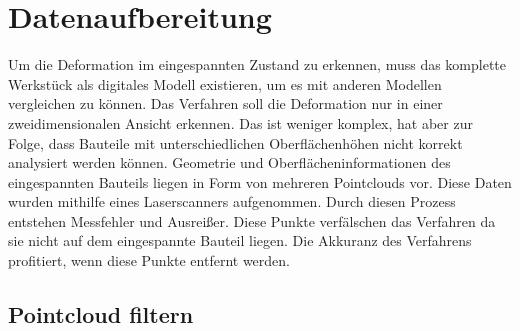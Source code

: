 

\chapter{Datenaufbereitung}

Um die Deformation im eingespannten Zustand zu erkennen, muss das komplette Werkstück
als digitales Modell existieren, um es mit anderen Modellen vergleichen zu können.
Das Verfahren soll die Deformation nur in einer zweidimensionalen Ansicht erkennen. 
Das ist weniger komplex, hat aber zur Folge, dass Bauteile mit unterschiedlichen 
Oberflächenhöhen nicht korrekt analysiert werden können. 
Geometrie und Oberflächeninformationen des eingespannten Bauteils liegen 
in Form von mehreren Pointclouds vor.
Diese Daten wurden mithilfe eines Laserscanners aufgenommen. Durch diesen Prozess 
entstehen Messfehler und Ausreißer. Diese Punkte verfälschen das Verfahren da sie 
nicht auf dem eingespannte Bauteil liegen. Die Akkuranz des Verfahrens profitiert, 
wenn diese Punkte entfernt werden.

\section{Pointcloud filtern}


